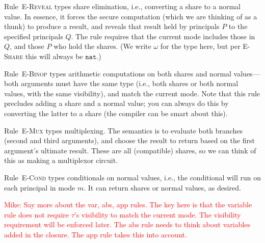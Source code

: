 \documentclass[10pt]{article}
\newcommand{\rulelab}[1]{{\small \textsc{#1}}}
\newcommand{\kw}[1]{\ensuremath{\mathtt{#1}}}
\newcommand{\tnat}{\ensuremath{\mathtt{nat}}}
\newcommand{\isec}{\ensuremath{\mathtt{pmap}}}
\newcommand{\sectyp}[3]{\ensuremath{{#1} \{~{#2}:{#3}~\}}}
\newcommand{\epar}[2]{\ensuremath{\kw{par}~{#1}~{#2}}}
\newcommand{\econd}[3]{\ensuremath{\kw{if}~{#1}~\kw{then}~{#2}~\kw{else}~{#3}}}
\newcommand{\mwh}[1]{\textcolor{red}{Mike: #1}}
\begin{document}
Rule~\rulelab{E-Reveal} types share elimination, i.e., converting a
share to a normal value. In essence, it forces the secure computation
(which we are thinking of as a thunk) to produce a result, and reveals
that result held by principals $P$ to the specified principals
$Q$. The rule requires that the current mode includes those in $Q$,
and those $P$ who hold the shares. (We write $\omega$ for the type
here, but per \rulelab{E-Share} this will always be $\tnat$.)

Rule~\rulelab{E-Binop} types arithmetic computations on both shares
and normal values---both arguments must have the same type (i.e., both
shares or both normal values, with the same visibility), and match the
current mode. Note that this rule precludes adding a 
share and a normal value; you can always do this by converting the
latter to a share (the compiler can be smart about this).

Rule~\rulelab{E-Mux} types multiplexing. The semantics is to evaluate
both branches (second and third arguments), and choose the result to
return based on the first argument's ultimate result. These are all
(compatible) shares, so we can think of this as making a multiplexor
circuit. 

Rule~\rulelab{E-Cond} types conditionals on normal values, i.e., the
conditional will run on each principal in mode $m$. It can return
shares or normal values, as desired. 

\mwh{Say more about the var, abs, app rules. The key here is that the
  variable rule does not require $\tau$'s visibility to match the
  current mode. The visibility requirement will be enforced later. The
  abs rule needs to think about variables added in the closure. The
  app rule takes this into account.}

\end{document}
